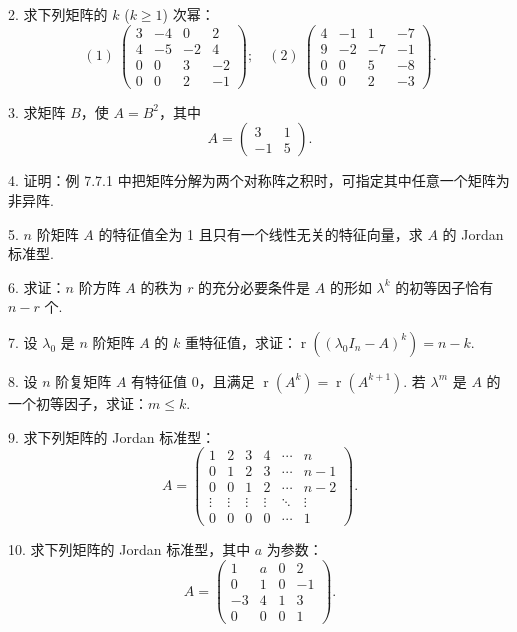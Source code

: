 \documentclass[UTF8,12pt,a4paper,fontset=fandol]{ctexart}
\begin{document}
2. 求下列矩阵的 $k$ ($k\geq 1$) 次幂：
\[
(1)\ \left(\begin{array}{rrrr}
3 & -4 & 0 & 2\\
4 & -5 & -2 & 4\\
0 & 0 & 3 & -2\\
0 & 0 & 2 & -1
\end{array}\right);\quad
(2)\ \left(\begin{array}{rrrr}
4 & -1 & 1 & -7\\
9 & -2 & -7 & -1\\
0 & 0 & 5 & -8\\
0 & 0 & 2 & -3
\end{array}\right).
\]

3. 求矩阵 $B$，使 $A=B^2$，其中
\[
A=\left(\begin{array}{rr}
3 & 1\\
-1 & 5
\end{array}\right).
\]

4. 证明：例 7.7.1 中把矩阵分解为两个对称阵之积时，可指定其中任意一个矩阵为非异阵.

5. $n$ 阶矩阵 $A$ 的特征值全为 1 且只有一个线性无关的特征向量，求 $A$ 的 Jordan 标准型.

6. 求证：$n$ 阶方阵 $A$ 的秩为 $r$ 的充分必要条件是 $A$ 的形如 $\lambda^k$ 的初等因子恰有 $n-r$ 个.

7. 设 $\lambda_0$ 是 $n$ 阶矩阵 $A$ 的 $k$ 重特征值，求证：$\operatorname{r}((\lambda_0I_n-A)^k)=n-k$.

8. 设 $n$ 阶复矩阵 $A$ 有特征值 0，且满足 $\operatorname{r}(A^k)=\operatorname{r}(A^{k+1})$. 若 $\lambda^m$ 是 $A$ 的一个初等因子，求证：$m\leq k$.

9. 求下列矩阵的 Jordan 标准型：
\[
A=\left(\begin{array}{cccccc}
1 & 2 & 3 & 4 & \cdots & n\\
0 & 1 & 2 & 3 & \cdots & n-1\\
0 & 0 & 1 & 2 & \cdots & n-2\\
\vdots & \vdots & \vdots & \vdots & \ddots & \vdots\\
0 & 0 & 0 & 0 & \cdots & 1
\end{array}\right).
\]

10. 求下列矩阵的 Jordan 标准型，其中 $a$ 为参数：
\[
A=\left(\begin{array}{rrrr}
1 & a & 0 & 2\\
0 & 1 & 0 & -1\\
-3 & 4 & 1 & 3\\
0 & 0 & 0 & 1
\end{array}\right).
\]
\end{document}
